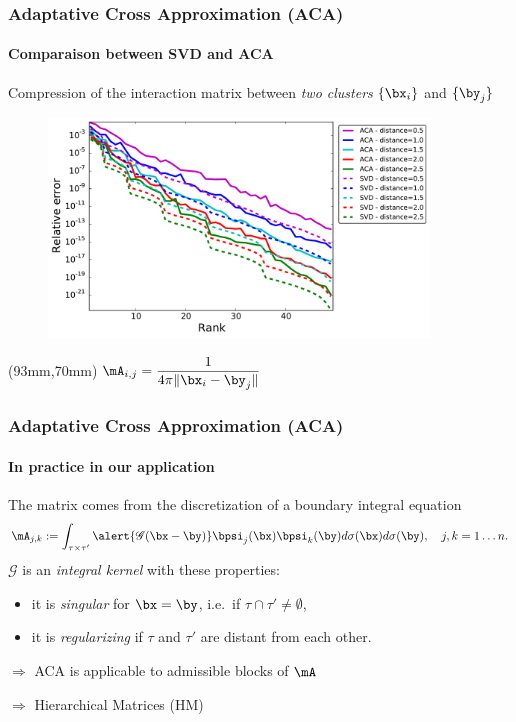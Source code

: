 \begin{frame}
\frametitle{Adaptative Cross Approximation (ACA)}
\framesubtitle{Comparaison between SVD and ACA} 
Compression of the interaction matrix between \emph{two clusters} $\{ \bx_i\}$ and $\{ \by_j\}$
\begin{figure}
	\centering 
	\includegraphics[width=0.9\textwidth]{../images/graphe_output_err_decrease}
\end{figure}

\begin{textblock*}{50mm}(93mm,70mm)
$\mA_{i,j}=\dfrac{1}{4 \pi \Vert\bx_i - \by_j \Vert }$
\end{textblock*}

\end{frame}


\begin{frame}
\frametitle{Adaptative Cross Approximation (ACA)}
\framesubtitle{In practice in our application} 
The matrix comes from the discretization of a boundary integral equation 
\begin{equation*}\label{GalerkinMatrix}
\mA_{j,k}:= \int_{\tau\times\tau'} \alert{\mathscr{G}(\bx-\by)} \bpsi_{j}(\bx)\bpsi_{k}(\by) d\sigma(\bx) d\sigma(\by),\quad j,k = 1\dots n.
\end{equation*}
\alert{$\mathscr{G}$} is an \emph{integral kernel} with these properties:
\begin{itemize}
\item it is \emph{singular} for $\bx = \by$, i.e.~if $\tau \cap \tau' \ne \emptyset$,
\item it is \emph{regularizing} if $\tau$ and $\tau'$ are \alert{distant} from each other. 
\end{itemize}

\bigskip
 $\Rightarrow$ ACA is applicable to \alert{admissible blocks} of $\mA$
 
 \medskip
 $\Rightarrow$ Hierarchical Matrices (HM)
\end{frame}

